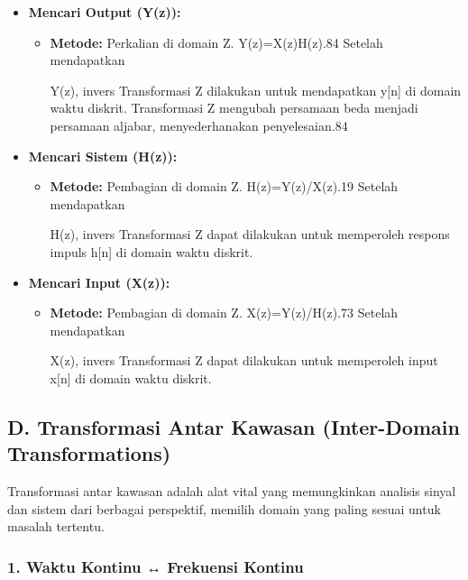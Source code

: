 \documentclass[
  letterpaper,
  DIV=11,
  numbers=noendperiod]{scrreprt}
\begin{document}
\begin{itemize}
\item
  \textbf{Mencari Output (Y(z)):}

  \begin{itemize}
  \item
    \textbf{Metode:} Perkalian di domain Z. Y(z)=X(z)H(z).84 Setelah
    mendapatkan

    Y(z), invers Transformasi Z dilakukan untuk mendapatkan y{[}n{]} di
    domain waktu diskrit. Transformasi Z mengubah persamaan beda menjadi
    persamaan aljabar, menyederhanakan penyelesaian.84
  \end{itemize}
\item
  \textbf{Mencari Sistem (H(z)):}

  \begin{itemize}
  \item
    \textbf{Metode:} Pembagian di domain Z. H(z)=Y(z)/X(z).19 Setelah
    mendapatkan

    H(z), invers Transformasi Z dapat dilakukan untuk memperoleh respons
    impuls h{[}n{]} di domain waktu diskrit.
  \end{itemize}
\item
  \textbf{Mencari Input (X(z)):}

  \begin{itemize}
  \item
    \textbf{Metode:} Pembagian di domain Z. X(z)=Y(z)/H(z).73 Setelah
    mendapatkan

    X(z), invers Transformasi Z dapat dilakukan untuk memperoleh input
    x{[}n{]} di domain waktu diskrit.
  \end{itemize}
\end{itemize}

\subsection{D. Transformasi Antar Kawasan (Inter-Domain
Transformations)}\label{d.-transformasi-antar-kawasan-inter-domain-transformations}

Transformasi antar kawasan adalah alat vital yang memungkinkan analisis
sinyal dan sistem dari berbagai perspektif, memilih domain yang paling
sesuai untuk masalah tertentu.

\subsubsection{1. Waktu Kontinu ↔ Frekuensi
Kontinu}\label{waktu-kontinu-frekuensi-kontinu}
\end{document}
